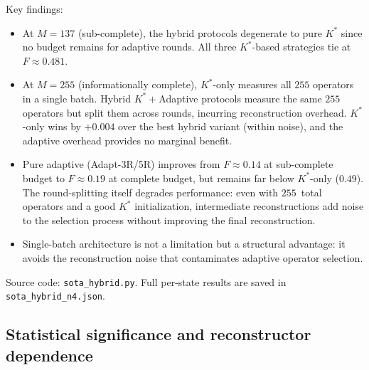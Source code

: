 \documentclass[twocolumn,prx,aps,superscriptaddress,longbibliography]{revtex4-2}
\begin{document}
\begin{table}[tb]
\centering
\caption{Cross-budget comparison of pure and hybrid strategies.
Overall mean fidelity across $22$~states (excluding W).
At $n = 4$: $4^n - 1 = 255$ non-identity Pauli operators.
Budget $2\times$ and $3\times$ both cap at $255$ (informationally
complete).}
\label{tab:hybrid}
\end{table}

Key findings:
\begin{itemize}
\item At $M = 137$ (sub-complete), the hybrid protocols
degenerate to pure $K^*$ since no budget remains for adaptive
rounds.  All three $K^*$-based strategies tie at $F \approx 0.481$.
\item At $M = 255$ (informationally complete), $K^*$-only
measures all $255$ operators in a single batch.
Hybrid $K^*{+}$Adaptive protocols measure the same $255$
operators but split them across rounds, incurring reconstruction
overhead.  $K^*$-only wins by $+0.004$ over the best hybrid
variant (within noise), and the adaptive overhead provides no
marginal benefit.
\item Pure adaptive (Adapt-3R/5R) improves from $F \approx 0.14$
at sub-complete budget to $F \approx 0.19$ at complete budget, but
remains far below $K^*$-only ($0.49$).  The round-splitting itself
degrades performance: even with $255$~total operators and a good
$K^*$ initialization, intermediate reconstructions add noise to
the selection process without improving the final reconstruction.
\item Single-batch architecture is not a limitation but a
structural advantage: it avoids the reconstruction noise that
contaminates adaptive operator selection.
\end{itemize}

Source code: \texttt{sota\_hybrid.py}.  Full per-state results are
saved in \texttt{sota\_hybrid\_n4.json}.

\subsection{Statistical significance and reconstructor dependence}
\label{sec:significance}
\end{document}
